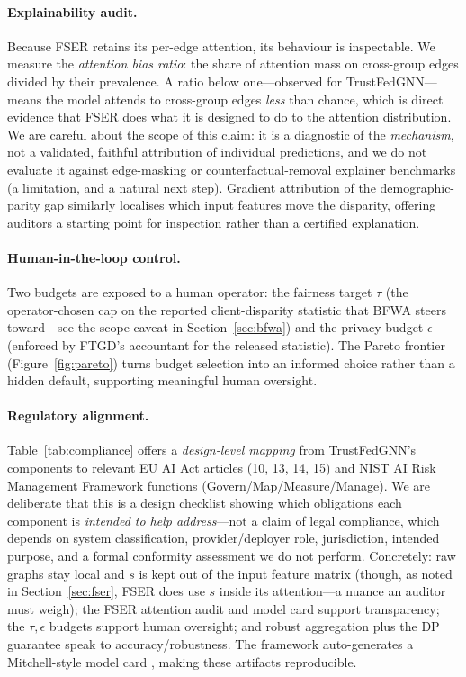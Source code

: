 \documentclass[pdflatex,sn-mathphys-num]{sn-jnl}
\theoremstyle{thmstyleone}%
\theoremstyle{thmstyletwo}%
\theoremstyle{thmstylethree}%
\begin{document}
\paragraph{Explainability audit.}
Because FSER retains its per-edge attention, its behaviour is inspectable. We
measure the \emph{attention bias ratio}: the share of attention mass on
cross-group edges divided by their prevalence. A ratio below one---observed for
TrustFedGNN---means the model attends to cross-group edges \emph{less} than
chance, which is direct evidence that FSER does what it is designed to do to the
attention distribution. We are careful about the scope of this claim: it is a
diagnostic of the \emph{mechanism}, not a validated, faithful attribution of
individual predictions, and we do not evaluate it against edge-masking or
counterfactual-removal explainer benchmarks (a limitation, and a natural next
step). Gradient attribution of the demographic-parity gap similarly localises
which input features move the disparity, offering auditors a starting point for
inspection rather than a certified explanation.

\paragraph{Human-in-the-loop control.}
Two budgets are exposed to a human operator: the fairness target $\tau$ (the
operator-chosen cap on the reported client-disparity statistic that BFWA steers
toward---see the scope caveat in Section~\ref{sec:bfwa}) and the privacy budget
$\epsilon$ (enforced by FTGD's accountant for the released statistic). The Pareto
frontier (Figure~\ref{fig:pareto}) turns budget selection into an informed choice
rather than a hidden default, supporting meaningful human oversight.

\paragraph{Regulatory alignment.}
Table~\ref{tab:compliance} offers a \emph{design-level mapping} from
TrustFedGNN's components to relevant EU AI Act articles (10, 13, 14, 15) and NIST
AI Risk Management Framework functions (Govern/Map/Measure/Manage). We are
deliberate that this is a design checklist showing which obligations each
component is \emph{intended to help address}---not a claim of legal compliance,
which depends on system classification, provider/deployer role, jurisdiction,
intended purpose, and a formal conformity assessment we do not perform. Concretely:
raw graphs stay local and $s$ is kept out of the input feature matrix (though, as
noted in Section~\ref{sec:fser}, FSER does use $s$ inside its attention---a
nuance an auditor must weigh); the FSER attention audit and model card support
transparency; the $\tau,\epsilon$ budgets support human oversight; and robust
aggregation plus the DP guarantee speak to accuracy/robustness. The framework
auto-generates a Mitchell-style model card \cite{mitchell2019model}, making these
artifacts reproducible.
\end{document}

